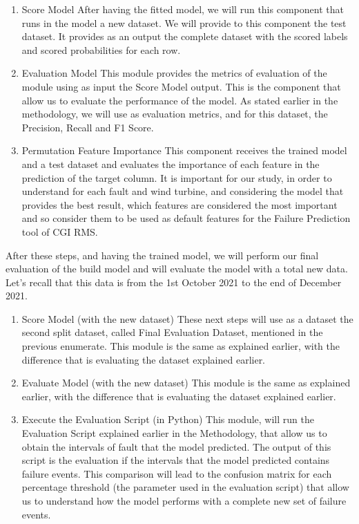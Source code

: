 \begin{enumerate}
    \item{Score Model}
After having the fitted model, we will run this component that runs in the model a new dataset. We will provide to this component the test dataset. It provides as an output the complete dataset with the scored labels and scored probabilities for each row.
    
    \item{Evaluation Model}
This module provides the metrics of evaluation of the module using as input the Score Model output. This is the component that allow us to evaluate the performance of the model. As stated earlier in the methodology, we will use as evaluation metrics, and for this dataset, the Precision, Recall and F1 Score.
    
    \item{Permutation Feature Importance}
This component receives the trained model and a test dataset and evaluates the importance of each feature in the prediction of the target column.
It is important for our study, in order to understand for each fault and wind turbine, and considering the model that provides the best result, which features are considered the most important and so consider them to be used as default features for the Failure Prediction tool of CGI RMS.
\end{enumerate}

After these steps, and having the trained model, we will perform our final evaluation of the build model and will evaluate the model with a total new data. Let's recall that this data is from the 1st October 2021 to the end of December 2021.

\begin{enumerate}
    \item{Score Model (with the new dataset)}
These next steps will use as a dataset the second split dataset, called Final Evaluation Dataset, mentioned in the previous enumerate.
This module is the same as explained earlier, with the difference that is evaluating the dataset explained earlier.

    \item{Evaluate Model (with the new dataset)}
This module is the same as explained earlier, with the difference that is evaluating the dataset explained earlier.
    
    \item{Execute the Evaluation Script (in Python)}
This module, will run the Evaluation Script explained earlier in the Methodology, that allow us to obtain the intervals of fault that the model predicted. The output of this script is the evaluation if the intervals that the model predicted contains failure events. This comparison will lead to the confusion matrix for each percentage threshold (the parameter used in the evaluation script) that allow us to understand how the model performs with a complete new set of failure events.
\end{enumerate}

